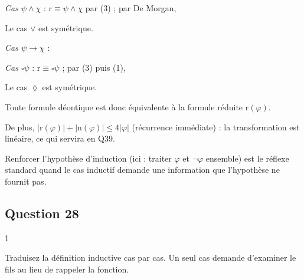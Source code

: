 \documentclass[11pt,a4paper]{article}
\providecommand{\Box}{\square}
\providecommand{\Diamond}{\lozenge}
\newcommand{\equationajustee}[1]{%
  \sbox{\boiteequation}{$\displaystyle #1$}%
  \ifdim\wd\boiteequation>\linewidth
    \[\resizebox{\linewidth}{!}{\usebox{\boiteequation}}\]%
  \else
    \[#1\]%
  \fi}
\begin{document}
\emph{Cas \(\psi\wedge\chi\)} : \(\mathrm r\equiv\psi\wedge\chi\) par (3) ; par De Morgan,

\equationajustee{
\begin{aligned}
\mathrm n&\equiv\neg\psi\vee\neg\chi\\
&\equiv\neg(\psi\wedge\chi)
\end{aligned}
}

Le cas \(\vee\) est symétrique.

\emph{Cas \(\psi\to\chi\)} :

\equationajustee{
\begin{aligned}
\mathrm r&\equiv\neg\psi\vee\chi\\
&\equiv\psi\to\chi\\[4pt]
\mathrm n&\equiv\psi\wedge\neg\chi\\
&\equiv\neg(\neg\psi\vee\chi)
\end{aligned}
}

\emph{Cas \(\Box\psi\)} : \(\mathrm r\equiv\Box\psi\) ; par (3) puis (1),

\equationajustee{
\begin{aligned}
\mathrm n&\equiv\Diamond\neg\psi\\
&\equiv\neg\Box\psi
\end{aligned}
}

Le cas \(\Diamond\) est symétrique.

Toute formule déontique est donc équivalente à la formule réduite \(\mathrm r(\varphi)\).

De plus, \(|\mathrm r(\varphi)|+|\mathrm n(\varphi)|\le4|\varphi|\) (récurrence immédiate) : la transformation est linéaire, ce qui servira en Q39.

\begin{methode}

Renforcer l'hypothèse d'induction (ici : traiter \(\varphi\) et \(\neg\varphi\) ensemble) est le réflexe standard quand le cas inductif demande une information que l'hypothèse ne fournit pas.

\end{methode}

\hypertarget{question-28}{%
\subsection{Question 28}\label{question-28}}

\begin{indication}{1}

Traduisez la définition inductive cas par cas. Un seul cas demande d'examiner le fils au lieu de rappeler la fonction.

\end{indication}
\end{document}
